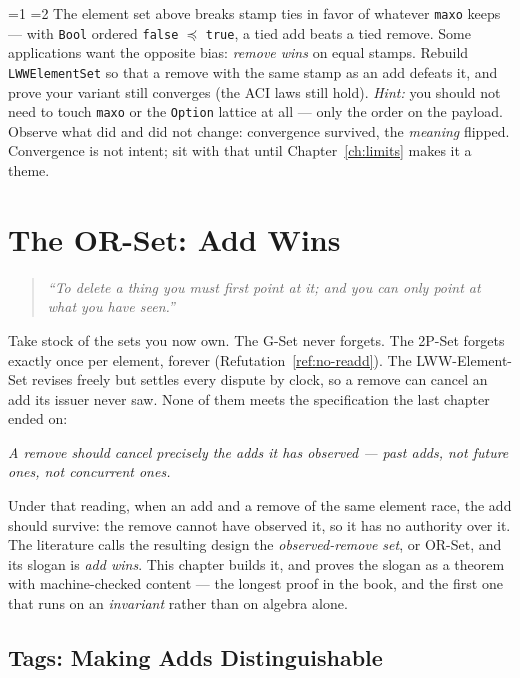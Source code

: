 \documentclass[12pt, a4paper, openright]{book}
\theoremstyle{thmstyle}
\theoremstyle{defstyle}
\newcommand{\lc}[1]{\texttt{#1}}
\newcounter{exercise}[chapter]
\renewcommand{\theexercise}{\thechapter.\arabic{exercise}}
\newenvironment{exercisebox}[1][]{%
  \refstepcounter{exercise}%
  \begin{tcolorbox}[exercisebox,
    title={Exercise \theexercise\ifx\\#1\\\else\ --- #1\fi}]%
}{\end{tcolorbox}}
\newcommand{\Stars}[1]{%
  \ifnum#1=1 \ding{72}\else\ifnum#1=2 \ding{72}\ding{72}\else
  \ding{72}\ding{72}\ding{72}\fi\fi\enspace}
\begin{document}
\begin{exercisebox}[Remove wins]
\label{ex:remove-wins}
  \Stars{3} The element set above breaks stamp ties in favor of whatever
  \lc{maxo} keeps --- with \lc{Bool} ordered
  \lc{false} $\preccurlyeq$ \lc{true}, a tied add beats a tied remove.
  Some applications want the opposite bias: \emph{remove wins} on equal
  stamps. Rebuild \lc{LWWElementSet} so that a remove with the same
  stamp as an add defeats it, and prove your variant still converges
  (the ACI laws still hold). \emph{Hint:} you should not need to touch
  \lc{maxo} or the \lc{Option} lattice at all --- only the order on the
  payload. Observe what did and did not change: convergence survived,
  the \emph{meaning} flipped. Convergence is not intent; sit with that
  until Chapter~\ref{ch:limits} makes it a theme.
\end{exercisebox}

\chapter{The OR-Set: Add Wins}
\label{ch:orset}

\begin{quote}
  \itshape
  ``To delete a thing you must first point at it; and you can only
  point at what you have seen.''
\end{quote}

Take stock of the sets you now own. The G-Set never forgets. The 2P-Set
forgets exactly once per element, forever
(Refutation~\ref{ref:no-readd}). The LWW-Element-Set revises freely but
settles every dispute by clock, so a remove can cancel an add its issuer
never saw. None of them meets the specification the last chapter ended
on:

\emph{A remove should cancel precisely the adds it has observed ---
past adds, not future ones, not concurrent ones.}

Under that reading, when an add and a remove of the same element race,
the add should survive: the remove cannot have observed it, so it has no
authority over it. The literature calls the resulting design the
\emph{observed-remove set}, or OR-Set, and its slogan is \emph{add
wins}. This chapter builds it, and proves the slogan as a theorem with
machine-checked content --- the longest proof in the book, and the first
one that runs on an \emph{invariant} rather than on algebra alone.

\section{Tags: Making Adds Distinguishable}
\label{sec:orset-tags}
\end{document}
